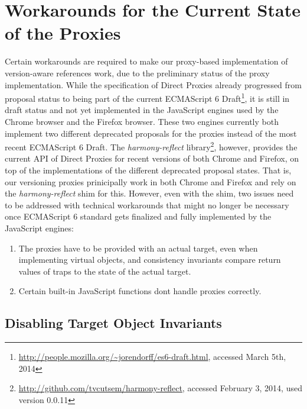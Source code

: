


\section{Workarounds for the Current State of the Proxies} \label{sec:IMPLEMENTATION:4}

Certain workarounds are required to make our proxy-based implementation of version-aware references work, due to the preliminary status of the proxy implementation.
While the specification of Direct Proxies already progressed from proposal status to being part of the current ECMAScript 6 Draft\footnote{\url{http://people.mozilla.org/~jorendorff/es6-draft.html}, accessed March 5th, 2014}, it is still in draft status and not yet implemented in the JavaScript engines used by the Chrome browser and the Firefox browser.
These two engines currently both implement two different deprecated proposals for the proxies instead of the most recent ECMAScript 6 Draft.
The \emph{harmony-reflect} library\footnote{\url{http://github.com/tvcutsem/harmony-reflect}, accessed February 3, 2014, used version 0.0.11}, however, provides the current API of Direct Proxies for recent versions of both Chrome and Firefox, on top of the implementations of the different deprecated proposal states.
That is, our versioning proxies prinicipally work in both Chrome and Firefox and rely on the \emph{harmony-reflect} shim for this.
However, even with the shim, two issues need to be addressed with technical workarounds that might no longer be necessary once ECMAScript 6 standard gets finalized and fully implemented by the JavaScript engines: 

\begin{enumerate}
    \item The proxies have to be provided with an actual target, even when implementing virtual objects, and consistency invariants compare return values of traps to the state of the actual target. 
    \item Certain built-in JavaScript functions dont handle proxies correctly.
\end{enumerate}



\subsection{Disabling Target Object Invariants}

